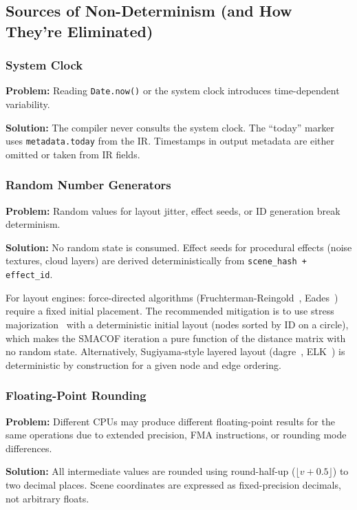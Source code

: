 \subsection{Sources of Non-Determinism (and How They're Eliminated)}

\subsubsection{System Clock}

\textbf{Problem:} Reading \texttt{Date.now()} or the system clock introduces time-dependent variability.

\textbf{Solution:} The compiler never consults the system clock. The ``today'' marker uses \texttt{metadata.today} from the IR. Timestamps in output metadata are either omitted or taken from IR fields.

\subsubsection{Random Number Generators}

\textbf{Problem:} Random values for layout jitter, effect seeds, or ID generation break determinism.

\textbf{Solution:} No random state is consumed. Effect seeds for procedural effects (noise textures, cloud layers) are derived deterministically from \texttt{scene\_hash + effect\_id}.

For layout engines: force-directed algorithms (Fruchterman-Reingold~\cite{fruchterman1991}, Eades~\cite{eades1984}) require a fixed initial placement. The recommended mitigation is to use stress majorization~\cite{gansnerStressMaj2004} with a deterministic initial layout (nodes sorted by ID on a circle), which makes the SMACOF iteration a pure function of the distance matrix with no random state. Alternatively, Sugiyama-style layered layout (dagre~\cite{dagre}, ELK~\cite{elk}) is deterministic by construction for a given node and edge ordering.

\subsubsection{Floating-Point Rounding}

\textbf{Problem:} Different CPUs may produce different floating-point results for the same operations due to extended precision, FMA instructions, or rounding mode differences.

\textbf{Solution:} All intermediate values are rounded using round-half-up ($\lfloor v + 0.5 \rfloor$) to two decimal places. Scene coordinates are expressed as fixed-precision decimals, not arbitrary floats.

